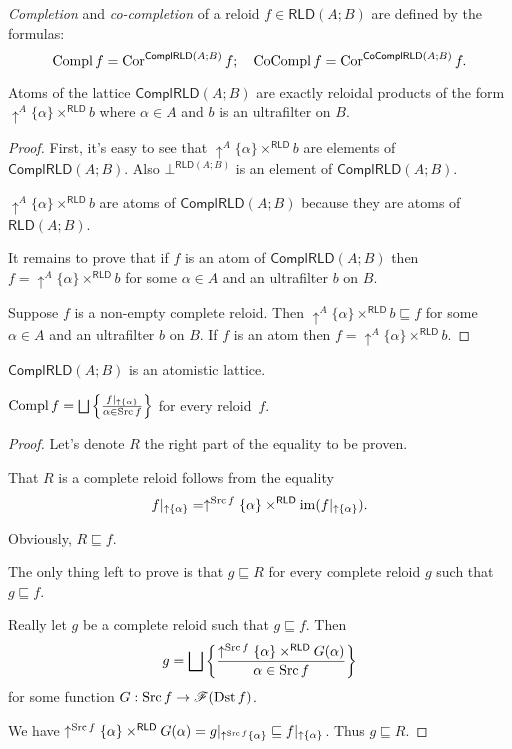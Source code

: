 \begin{defn}
\emph{Completion}
and \emph{co-completion} of a reloid $f\in\mathsf{RLD}(A;B)$ are
defined by the formulas:
\[
\operatorname{Compl} f=\operatorname{Cor}^{\mathsf{ComplRLD}(A;B)}f;\quad\operatorname{CoCompl} f=\operatorname{Cor}^{\mathsf{CoComplRLD}(A;B)}f.
\]
\end{defn}
\begin{thm}
Atoms of the lattice $\mathsf{ComplRLD}(A;B)$ are exactly reloidal
products of the form $\uparrow^{A}\{\alpha\}\times^{\mathsf{RLD}}b$
where $\alpha\in A$ and $b$ is an ultrafilter on $B$.\end{thm}
\begin{proof}
First, it's easy to see that $\uparrow^{A}\{\alpha\}\times^{\mathsf{RLD}}b$
are elements of $\mathsf{ComplRLD}(A;B)$. Also $\bot^{\mathsf{RLD}(A;B)}$
is an element of $\mathsf{ComplRLD}(A;B)$.

$\uparrow^{A}\{\alpha\}\times^{\mathsf{RLD}}b$ are atoms of $\mathsf{ComplRLD}(A;B)$
because they are atoms of $\mathsf{RLD}(A;B)$.

It remains to prove that if $f$ is an atom of $\mathsf{ComplRLD}(A;B)$
then $f=\uparrow^{A}\{\alpha\}\times^{\mathsf{RLD}}b$ for some $\alpha\in A$
and an ultrafilter $b$ on $B$.

Suppose $f$ is a non-empty complete reloid. Then $\uparrow^{A}\{\alpha\}\times^{\mathsf{RLD}}b\sqsubseteq f$
for some $\alpha\in A$ and an ultrafilter $b$ on $B$. If $f$ is
an atom then $f=\uparrow^{A}\{\alpha\}\times^{\mathsf{RLD}}b$.\end{proof}
\begin{obvious}
$\mathsf{ComplRLD}(A;B)$ is an atomistic lattice.\end{obvious}
\begin{prop}
$\operatorname{Compl} f=\bigsqcup\left\{ \frac{f|_{\uparrow \{\alpha\}}}{\alpha\in\operatorname{Src} f}\right\}$
for every reloid~$f$.\end{prop}
\begin{proof}
Let's denote $R$ the right part of the equality to be proven.

That $R$ is a complete reloid follows from the equality
\[
f|_{\uparrow \{\alpha\}}=\uparrow^{\operatorname{Src} f}\{\alpha\}\times^{\mathsf{RLD}}\operatorname{im}(f|_{\uparrow \{\alpha\}}).
\]

Obviously, $R\sqsubseteq f$.

The only thing left to prove is that $g\sqsubseteq R$ for every complete
reloid $g$ such that $g\sqsubseteq f$.

Really let $g$ be a complete reloid such that $g\sqsubseteq f$.
Then
\[
g=\bigsqcup\left\{ \frac{\uparrow^{\operatorname{Src} f}\{\alpha\}\times^{\mathsf{RLD}}G(\alpha)}{\alpha\in\operatorname{Src} f}\right\}
\]
for some function $G:\operatorname{Src} f\rightarrow\mathscr{F}(\operatorname{Dst} f)$.

We have $\uparrow^{\operatorname{Src} f}\{\alpha\}\times^{\mathsf{RLD}}G(\alpha)=g|_{\uparrow^{\operatorname{Src} f}\{\alpha\}}\sqsubseteq f|_{\uparrow \{\alpha\}}$.
Thus $g\sqsubseteq R$.\end{proof}

